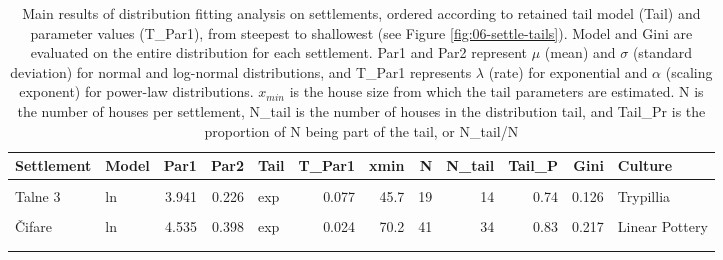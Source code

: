 \documentclass[
  12pt,
]{book}
\begin{document}
\begin{landscape}\begin{table}

\caption{\label{tab:06-settle-tab}Main results of distribution fitting analysis on settlements, ordered according to retained tail model (Tail) and parameter values (T\_Par1), from steepest to shallowest (see Figure \ref{fig:06-settle-tails}). Model and Gini are evaluated on the entire distribution for each settlement. Par1 and Par2 represent \(\mu\) (mean) and \(\sigma\) (standard deviation) for normal and log-normal distributions, and T\_Par1 represents \(\lambda\) (rate) for exponential and \(\alpha\) (scaling exponent) for power-law distributions. \(x_{min}\) is the house size from which the tail parameters are estimated. N is the number of houses per settlement, N\_tail is the number of houses in the distribution tail, and Tail\_Pr is the proportion of N being part of the tail, or N\_tail/N}
\centering
\begin{tabular}[t]{llrrlrrrrrrl}
\toprule
Settlement & Model & Par1 & Par2 & Tail & T\_Par1 & xmin & N & N\_tail & Tail\_P & Gini & Culture\\
\midrule
\cellcolor{gray!6}{Úľany} & \cellcolor{gray!6}{norm} & \cellcolor{gray!6}{62.349} & \cellcolor{gray!6}{12.542} & \cellcolor{gray!6}{exp} & \cellcolor{gray!6}{0.109} & \cellcolor{gray!6}{63.6} & \cellcolor{gray!6}{34} & \cellcolor{gray!6}{17} & \cellcolor{gray!6}{0.50} & \cellcolor{gray!6}{0.113} & \cellcolor{gray!6}{Linear Pottery}\\
Talne 3 & ln & 3.941 & 0.226 & exp & 0.077 & 45.7 & 19 & 14 & 0.74 & 0.126 & Trypillia\\
\cellcolor{gray!6}{Vlkas} & \cellcolor{gray!6}{ln} & \cellcolor{gray!6}{4.534} & \cellcolor{gray!6}{0.387} & \cellcolor{gray!6}{exp} & \cellcolor{gray!6}{0.025} & \cellcolor{gray!6}{81.2} & \cellcolor{gray!6}{61} & \cellcolor{gray!6}{40} & \cellcolor{gray!6}{0.66} & \cellcolor{gray!6}{0.221} & \cellcolor{gray!6}{Linear Pottery}\\
Čifare & ln & 4.535 & 0.398 & exp & 0.024 & 70.2 & 41 & 34 & 0.83 & 0.217 & Linear Pottery\\
\cellcolor{gray!6}{Telince} & \cellcolor{gray!6}{ln} & \cellcolor{gray!6}{4.452} & \cellcolor{gray!6}{0.417} & \cellcolor{gray!6}{exp} & \cellcolor{gray!6}{0.024} & \cellcolor{gray!6}{59.3} & \cellcolor{gray!6}{13} & \cellcolor{gray!6}{12} & \cellcolor{gray!6}{0.92} & \cellcolor{gray!6}{0.228} & \cellcolor{gray!6}{Linear Pottery}\\
\addlinespace

\end{tabular}
\end{table}
\end{landscape}
\end{document}
